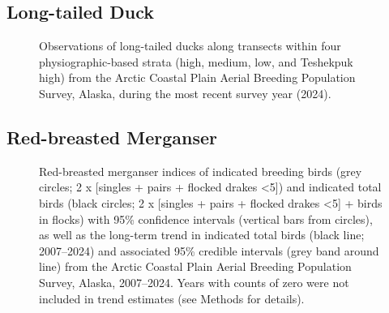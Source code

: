 \documentclass[
]{article}
\begin{document}
\endgroup{}

\newpage{}

\subsection*{Long-tailed Duck}\label{long-tailed-duck-2}

\begin{figure}


\caption{\label{fig-LTDUmap}Observations of long-tailed ducks along
transects within four physiographic-based strata (high, medium, low, and
Teshekpuk high) from the Arctic Coastal Plain Aerial Breeding Population
Survey, Alaska, during the most recent survey year (2024).}

\end{figure}%

\newpage{}

\subsection*{Red-breasted Merganser}\label{red-breasted-merganser}

\begin{figure}


\caption{\label{fig-RBME}Red-breasted merganser indices of indicated
breeding birds (grey circles; 2 x {[}singles + pairs + flocked drakes
\textless5{]}) and indicated total birds (black circles; 2 x {[}singles
+ pairs + flocked drakes \textless5{]} + birds in flocks) with 95\%
confidence intervals (vertical bars from circles), as well as the
long-term trend in indicated total birds (black line; 2007--2024) and
associated 95\% credible intervals (grey band around line) from the
Arctic Coastal Plain Aerial Breeding Population Survey, Alaska,
2007--2024. Years with counts of zero were not included in trend
estimates (see Methods for details).}

\end{figure}%

\newpage{}
\end{document}
